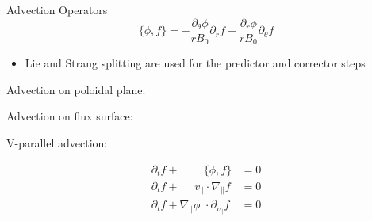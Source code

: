 \documentclass{beamer}
\newcommand{\hvv}[1]{\accentset{\rightharpoonup}{#1}}
\newcommand{\grad}{\ensuremath{\hvv{\nabla}}}
\begin{document}
\begin{frame}{Advection Operators}
\centering
\tcbox{$\partial_t f + \{\phi,f\} + v_\parallel \grad_\parallel f - \grad_\parallel\phi\,  \partial_{v_\parallel} f=0$}
\vspace{-2em}
\begin{equation*}
 \{\phi,f\}=-\frac{\partial_\theta\phi}{rB_0}\partial_r f + \frac{\partial_r\phi}{rB_0}\partial_\theta f
\end{equation*}

\begin{itemize}
\item Lie and Strang splitting are used for the predictor and corrector steps
\end{itemize}

\begin{minipage}[b]{.45\textwidth}
 Advection on poloidal plane:
 \vspace{.3em}
 
 Advection on flux surface:
 \vspace{.3em}
 
 V-parallel advection:
 \vspace{.4em}
\end{minipage}
\begin{minipage}[b]{.5\textwidth}
 \begin{align}
 \partial_t f + \,\,\,\,\,\,\,\,\,\,\,\,\, \{\phi, f\} &= 0 \label{Eq::Advection3}\\
 \partial_t f + \,\,\,\,\,\,\,\, v_\parallel \cdot \nabla_\parallel f &= 0 \label{Eq::Advection1}\\
 \partial_t f + \nabla_\parallel \phi\,\, \cdot \partial_{v_{\parallel}} f &= 0 \label{Eq::Advection2}
\end{align}
\end{minipage}

\end{frame}
\end{document}
